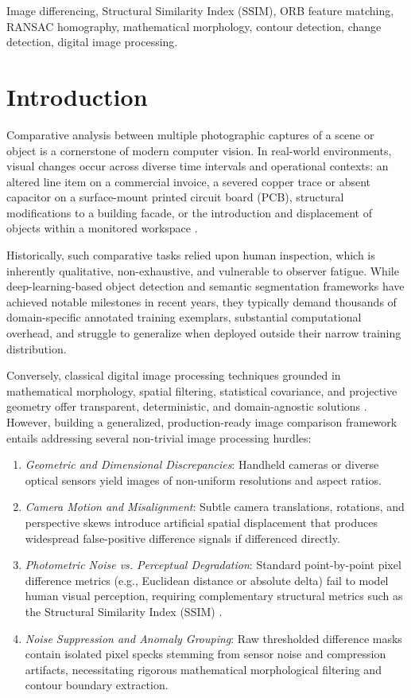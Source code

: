 \documentclass[conference]{IEEEtran}
\begin{document}
\begin{IEEEkeywords}
Image differencing, Structural Similarity Index (SSIM), ORB feature matching, RANSAC homography, mathematical morphology, contour detection, change detection, digital image processing.
\end{IEEEkeywords}

\section{Introduction}
Comparative analysis between multiple photographic captures of a scene or object is a cornerstone of modern computer vision. In real-world environments, visual changes occur across diverse time intervals and operational contexts: an altered line item on a commercial invoice, a severed copper trace or absent capacitor on a surface-mount printed circuit board (PCB), structural modifications to a building facade, or the introduction and displacement of objects within a monitored workspace \cite{radke2005image}. 

Historically, such comparative tasks relied upon human inspection, which is inherently qualitative, non-exhaustive, and vulnerable to observer fatigue. While deep-learning-based object detection and semantic segmentation frameworks have achieved notable milestones in recent years, they typically demand thousands of domain-specific annotated training exemplars, substantial computational overhead, and struggle to generalize when deployed outside their narrow training distribution.

Conversely, classical digital image processing techniques grounded in mathematical morphology, spatial filtering, statistical covariance, and projective geometry offer transparent, deterministic, and domain-agnostic solutions \cite{gonzalez2018digital}. However, building a generalized, production-ready image comparison framework entails addressing several non-trivial image processing hurdles:
\begin{enumerate}
    \item \textit{Geometric and Dimensional Discrepancies}: Handheld cameras or diverse optical sensors yield images of non-uniform resolutions and aspect ratios.
    \item \textit{Camera Motion and Misalignment}: Subtle camera translations, rotations, and perspective skews introduce artificial spatial displacement that produces widespread false-positive difference signals if differenced directly.
    \item \textit{Photometric Noise vs. Perceptual Degradation}: Standard point-by-point pixel difference metrics (e.g., Euclidean distance or absolute delta) fail to model human visual perception, requiring complementary structural metrics such as the Structural Similarity Index (SSIM) \cite{wang2004image}.
    \item \textit{Noise Suppression and Anomaly Grouping}: Raw thresholded difference masks contain isolated pixel specks stemming from sensor noise and compression artifacts, necessitating rigorous mathematical morphological filtering and contour boundary extraction.
\end{enumerate}
\end{document}
